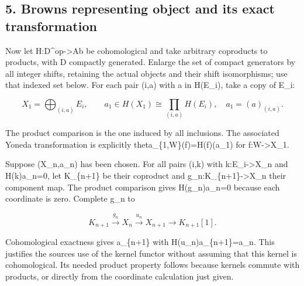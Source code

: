 \documentclass[11pt]{article}
\begin{document}
\subsection{5. Brown\textquotesingle s representing object and its exact transformation}\label{proofs-11121-11450-browns-representing-object-and-its-exact-transformation}

Now let H:\allowbreak{}D\textasciicircum{}op\allowbreak{}->Ab be cohomological and take arbitrary coproducts to products,\allowbreak{} with D compactly generated. Enlarge the set of compact generators by all integer shifts,\allowbreak{} retaining the actual objects and their shift isomorphisms; use that indexed set below. For each pair (i,\allowbreak{}a)\allowbreak{} with a in H(E\_\allowbreak{}i)\allowbreak{},\allowbreak{} take a copy of E\_\allowbreak{}i:\allowbreak{}

\[
 X_1=\bigoplus_{(i,a)}E_i,\qquad
 a_1\in H(X_1)\cong\prod_{(i,a)}H(E_i),\quad
 a_1=(a)_{(i,a)}.
\]

The product comparison is the one induced by all inclusions. The associated Yoneda transformation is explicitly theta\_\allowbreak{}\{1,\allowbreak{}W\}(f)\allowbreak{}\allowbreak{}=H(f)\allowbreak{}(a\_\allowbreak{}1)\allowbreak{} for f:\allowbreak{}W\allowbreak{}->X\_\allowbreak{}1.

Suppose (X\_\allowbreak{}n,\allowbreak{}a\_\allowbreak{}n)\allowbreak{} has been chosen. For all pairs (i,\allowbreak{}k)\allowbreak{} with k:\allowbreak{}E\_\allowbreak{}i\allowbreak{}->X\_\allowbreak{}n and H(k)\allowbreak{}a\_\allowbreak{}n\allowbreak{}=0,\allowbreak{} let K\_\allowbreak{}\{n\allowbreak{}+1\} be their coproduct and g\_\allowbreak{}n:\allowbreak{}K\_\allowbreak{}\{n\allowbreak{}+1\}\allowbreak{}->X\_\allowbreak{}n their component map. The product comparison gives H(g\_\allowbreak{}n)\allowbreak{}a\_\allowbreak{}n\allowbreak{}=0 because each coordinate is zero. Complete g\_\allowbreak{}n to

\[
 K_{n+1}\xrightarrow{g_n}X_n\xrightarrow{u_n}X_{n+1}
                       \longrightarrow K_{n+1}[1].
\]

Cohomological exactness gives a\_\allowbreak{}\{n\allowbreak{}+1\} with H(u\_\allowbreak{}n)\allowbreak{}a\_\allowbreak{}\{n\allowbreak{}+1\}\allowbreak{}=a\_\allowbreak{}n. This justifies the source\textquotesingle s use of the kernel functor without assuming that this kernel is cohomological. Its needed product property follows because kernels commute with products,\allowbreak{} or directly from the coordinate calculation just given.
\end{document}
